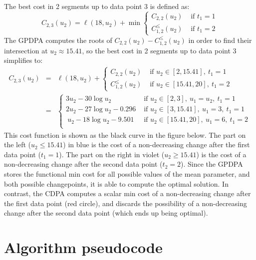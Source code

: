 \documentclass{article}
\begin{document}
The best cost in 2 segments up to data point 3 is defined as:
\begin{equation}
    C_{2,3}(u_2)=\ell(18, u_2) + \min
                \begin{cases}
                  C_{2,2}(u_2) & \text{ if } t_1=1\\
                  C^\leq_{1,2}(u_2) & \text{ if } t_1=2
                \end{cases}
\end{equation}
The GPDPA computes the roots of $C_{2,2}(u_2)-C^\leq_{1,2}(u_2)$ in
order to find their intersection at $u_2\approx15.41$, so the best
cost in 2 segments up to data point 3 simplifies to:
\begin{eqnarray}
C_{2,3}(u_2)  &=&\ell(18, u_2) + 
                \begin{cases}
                  C_{2,2}(u_2) & \text{ if }u_2\in[2, 15.41],\ t_1=1\\
                  C^\leq_{1,2}(u_2)& \text{ if }u_2\in[15.41, 20],\ t_1=2
                \end{cases}\\
            &=&
                \begin{cases}
                  3u_2 -30 \log u_2 & \text{ if } u_2\in[2,3],\ u_1=u_2,\ t_1=1\\
                  2u_2 -27 \log u_2 -0.296 & \text{ if } u_2\in[3, 15.41],\ u_1=3,\ t_1=1\\\
                  u_2 -18 \log u_2 -9.501  & \text{ if } u_2\in[15.41, 20],\ u_1=6,\ t_1=2\\
                \end{cases}
\end{eqnarray}
This cost function is shown as the black curve in the figure
below. The part on the left ($u_2\leq 15.41$) in blue is the cost of a
non-decreasing change after the first data point ($t_1=1$). The part
on the right in violet ($u_2\geq 15.41$) is the cost of a
non-decreasing change after the second data point ($t_2=2$). Since the
GPDPA stores the functional min cost for all possible values of the
mean parameter, and both possible changepoints, it is able to compute
the optimal solution. In contrast, the CDPA computes a scalar min cost
of a non-decreasing change after the first data point (red circle),
and discards the possibility of a non-decreasing change after the
second data point (which ends up being optimal).




\section{Algorithm pseudocode}
\end{document}
